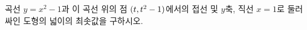 곡선 $y=x^2-1$과 이 곡선 위의 점 $(t{,}\mkern3mu\mathopen{}t^2-1)$에서의 접선 및 $y$축, 직선 $x=1$로 둘러싸인 도형의 넓이의 최솟값을 구하시오. 
